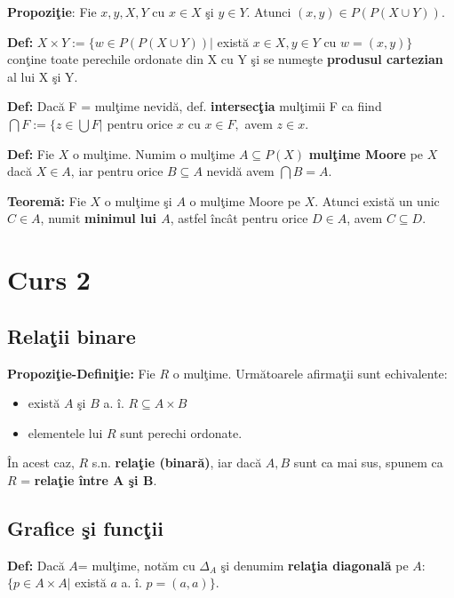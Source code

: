\documentclass{article}
\begin{document}
\begin{enumerate}
\textbf{Propozi\c tie}: Fie $x,y,X,Y$ cu $x\in X$ \c si $y\in Y$. Atunci $(x,y)\in P(P(X\cup Y))$.

\textbf{Def:} $X\times Y:= \{ w\in P(P(X\cup Y)) |$ exist\u a $x\in X,y\in Y$ cu $w=(x,y)\}$ con\c tine toate perechile ordonate din X cu Y \c si se nume\c ste \textbf{produsul cartezian} al lui X \c si Y.

\textbf{Def:} Dac\u a F = mul\c time nevid\u a, def. \textbf{intersec\c tia} mul\c timii F ca fiind $\bigcap F:=\{ z\in \bigcup F|$ pentru orice $x$ cu $x\in F,$ avem $z\in x$.

\textbf{Def:} Fie $X$ o mul\c time. Numim o mul\c time $A\subseteq P(X)$ \textbf{mul\c time Moore} pe $X$ dac\u a $X\in A$, iar pentru orice $B\subseteq A$ nevid\u a avem $\bigcap B=A$.

\textbf{Teorem\u a:} Fie $X$ o mul\c time \c si $A$ o mul\c time Moore pe $X$. Atunci exist\u a un unic $C\in A$, numit \textbf{minimul lui $A$}, astfel \^ inc\^ at pentru orice $D\in A$, avem $C\subseteq D$.

\end{enumerate}

\section{Curs 2}

\subsection{Rela\c tii binare}

\textbf{Propozi\c tie-Defini\c tie:} Fie $R$ o mul\c time. Urm\u atoarele afirma\c tii sunt echivalente:
\begin{itemize}
    \item exist\u a $A$ \c si $B$ a. \^ i. $R\subseteq A\times B$
    \item elementele lui $R$ sunt perechi ordonate.
\end{itemize}
\^ In acest caz, $R$ s.n. \textbf{rela\c tie (binar\u a)}, iar dac\u a $A,B$ sunt ca mai sus, spunem ca $R$ = \textbf{rela\c tie \^ intre A \c si B}.

\subsection{Grafice \c si func\c tii}

\textbf{Def:} Dac\u a $A$= mul\c time, not\u am cu $\Delta_A$ \c si denumim \textbf{rela\c tia diagonal\u a} pe $A$: $\{p\in A\times A|$ exist\u a $a$ a. \^ i. $p=(a,a)\}$.
\end{document}
